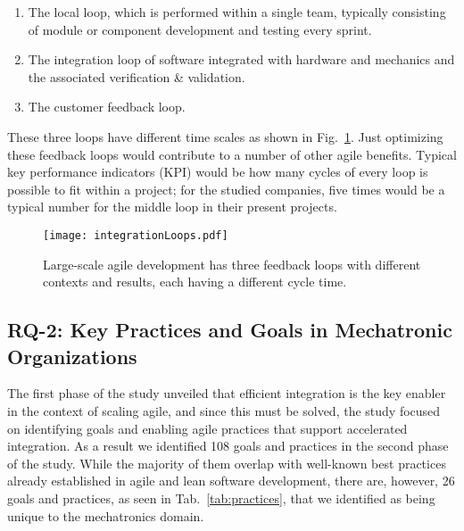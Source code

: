 \documentclass[10pt,a4paper]{IEEEtran} %
\begin{document}
\begin{enumerate}  
\item The local loop, which is performed within a single team, typically consisting of module or component development and testing every sprint.
\item The integration loop of software integrated with hardware and mechanics and the associated  verification \& validation.
\item The customer feedback loop.
\end{enumerate}

These three loops have different time scales as shown in Fig.~\ref{fig:loops}.
Just optimizing these feedback loops would contribute to a number of other agile benefits.
Typical key performance indicators (KPI) would be how many cycles of every loop is possible
to fit within a project; for the studied companies, five times would be a typical number for
the middle loop in their present projects.


\begin{figure}[htb!]
\centering
\texttt{[image: integrationLoops.pdf]}
\caption{Large-scale agile development has three feedback loops with different contexts and results, each having a different cycle time.}
\label{fig:loops}
\end{figure}

\subsection{RQ-2: Key Practices and Goals in Mechatronic Organizations}
\label{sec:practices}
The first phase of the study unveiled that efficient integration is the key enabler in the context of scaling agile, and since this must be solved, the study focused on identifying goals and enabling agile practices that support accelerated
integration. As a result we identified 108 goals and practices in the second phase of the study. While the majority of them overlap with well-known best practices already established in agile and lean software development, there are, however, 26 goals and practices, as seen in Tab.~\ref{tab:practices}, that we 
identified as being unique to the mechatronics domain.
\end{document}
